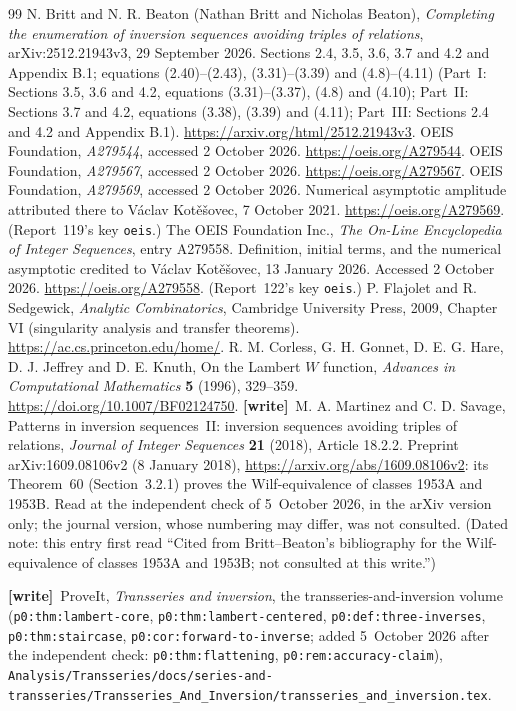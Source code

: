 \documentclass[11pt,letterpaper]{article}
\theoremstyle{remark}\newtheorem{remark}[theorem]{Remark}
\newcommand{\file}[1]{\nolinkurl{#1}}
\newcommand{\wtag}{\textup{\textbf{[write]}}}
\begin{document}
\clearpage
\begin{thebibliography}{99}
N. Britt and N. R. Beaton (Nathan Britt and Nicholas Beaton),
\emph{Completing the enumeration of inversion sequences avoiding
triples of relations}, arXiv:2512.21943v3, 29 September 2026.
Sections 2.4, 3.5, 3.6, 3.7 and 4.2 and Appendix B.1; equations (2.40)--(2.43), (3.31)--(3.39) and (4.8)--(4.11) (Part~I: Sections 3.5, 3.6 and 4.2, equations (3.31)--(3.37), (4.8) and (4.10); Part~II: Sections 3.7 and 4.2, equations (3.38), (3.39) and (4.11); Part~III: Sections 2.4 and 4.2 and Appendix B.1).
\url{https://arxiv.org/html/2512.21943v3}.
OEIS Foundation, \emph{A279544}, accessed 2 October 2026.
\url{https://oeis.org/A279544}.
OEIS Foundation, \emph{A279567}, accessed 2 October 2026.
\url{https://oeis.org/A279567}.
OEIS Foundation, \emph{A279569}, accessed 2 October 2026.
Numerical asymptotic amplitude attributed there to
V\'aclav Kot\v e\v sovec, 7 October 2021.
\url{https://oeis.org/A279569}.
(Report~119's key \texttt{oeis}.)
The OEIS Foundation Inc., \emph{The On-Line Encyclopedia of Integer
Sequences}, entry A279558. Definition, initial terms, and the
numerical asymptotic credited to V\'aclav Kot\v{e}\v{s}ovec,
13 January 2026. Accessed 2 October 2026.
\url{https://oeis.org/A279558}.
(Report~122's key \texttt{oeis}.)
P. Flajolet and R. Sedgewick, \emph{Analytic Combinatorics},
Cambridge University Press, 2009, Chapter VI (singularity analysis and transfer theorems).
\url{https://ac.cs.princeton.edu/home/}.
R. M. Corless, G. H. Gonnet, D. E. G. Hare, D. J. Jeffrey and D. E. Knuth,
On the Lambert $W$ function, \emph{Advances in Computational Mathematics}
\textbf{5} (1996), 329--359.
\url{https://doi.org/10.1007/BF02124750}.
\wtag\ M. A. Martinez and C. D. Savage, Patterns in inversion sequences~II: inversion sequences avoiding triples of relations, \emph{Journal of Integer Sequences} \textbf{21} (2018), Article 18.2.2. Preprint arXiv:1609.08106v2 (8 January 2018), \url{https://arxiv.org/abs/1609.08106v2}: its Theorem~60 (Section~3.2.1) proves the Wilf-equivalence of classes 1953A and 1953B. Read at the independent check of 5~October 2026, in the arXiv version only; the journal version, whose numbering may differ, was not consulted. (Dated note: this entry first read ``Cited from Britt--Beaton's bibliography for the Wilf-equivalence of classes 1953A and 1953B; not consulted at this write.'')
\raggedright\wtag\ ProveIt, \emph{Transseries and inversion}, the transseries-and-inversion volume (\texttt{p0:thm:lambert-core}, \texttt{p0:thm:lambert-centered}, \texttt{p0:def:three-inverses}, \texttt{p0:thm:staircase}, \texttt{p0:cor:forward-to-inverse}; added 5~October 2026 after the independent check: \texttt{p0:thm:flattening}, \texttt{p0:rem:accuracy-claim}), \file{Analysis/Transseries/docs/series-and-transseries/Transseries_And_Inversion/transseries_and_inversion.tex}.
\end{thebibliography}
\end{document}
